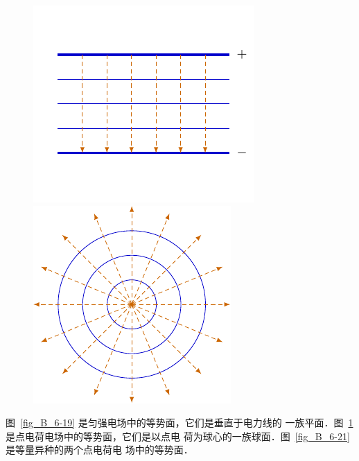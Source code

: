 \begin{figure}[htbp]
    \centering
    \begin{minipage}[t]{0.48\textwidth}
        \centering
        \includegraphics{fig/B/6-19.pdf}
        \caption{}\label{fig_B_6-19}
    \end{minipage}
    \begin{minipage}[t]{0.48\textwidth}
        \centering
        \includegraphics{fig/B/6-20.pdf}
        \caption{}\label{fig_B_6-20}
    \end{minipage}
\end{figure}


图~\ref{fig_B_6-19} 是匀强电场中的等势面，它们是垂直于电力线的
一族平面．图~\ref{fig_B_6-20} 是点电荷电场中的等势面，它们是以点电
荷为球心的一族球面．图~\ref{fig_B_6-21} 是等量异种的两个点电荷电
场中的等势面．

